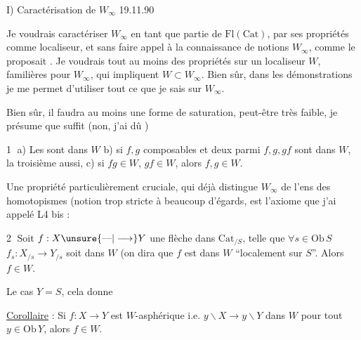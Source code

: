 
I) Caractérisation de $W_\infty$ \hfill 19.11.90

Je voudrais caractériser $W_\infty$ en tant que partie de $\mathrm{Fl}(\mathrm{Cat})$, par ses propriétés comme localiseur, et sans faire appel à la connaissance de notions   $W_\infty$, comme le proposait . Je voudrais tout au moins des propriétés sur un localiseur $W$, familières pour $W_\infty$, qui  impliquent $W\subset W_\infty$. Bien sûr, dans les démonstrations je me permet d'utiliser tout ce que je sais sur $W_\infty$.

Bien sûr, il faudra au moins une forme de saturation, peut-être très faible, je présume que  suffit (non, j'ai dû )


\textcircled{1} a) Les  sont dans $W$  b) si $f,g$ composables et deux parmi $f,g,gf$ sont dans $W$, la troisième aussi, c) si $fg\in W$, $gf\in W$, alors $f,g\in W$.


Une  propriété particulièrement cruciale, qui déjà distingue $W_\infty$ de l'ens des homotopismes (notion trop stricte à beaucoup d'égards, est l'axiome que j'ai appelé L4 bis :


\textcircled{2} Soit $f:X\unsure{\text{---}|\longrightarrow}Y$ une flèche dans $\mathrm{Cat}_{/S}$, telle que $\forall s\in\mathrm{Ob}\,S$ $f_s:X_{/s}\longrightarrow Y_{/s}$ soit dans $W$ (on dira que $f$ est  dans $W$ ``localement sur $S$''. Alors $f\in W$.

  Le cas $Y=S$, cela donne

\uline{Corollaire} : Si $f:X\longrightarrow Y$ est $W$-asphérique i.e. $y\backslash X\longrightarrow y\backslash Y$  dans $W$ pour tout $y\in\mathrm{Ob}\,Y$, alors $f\in W$.


